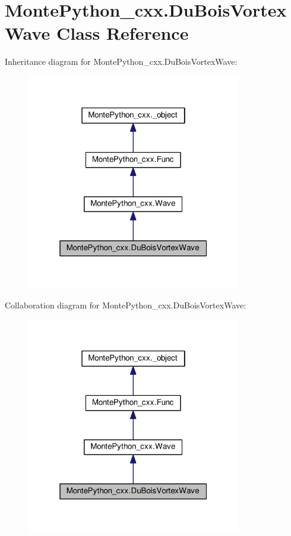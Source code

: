 \hypertarget{classMontePython__cxx_1_1DuBoisVortexWave}{}\section{Monte\+Python\+\_\+cxx.\+Du\+Bois\+Vortex\+Wave Class Reference}
\label{classMontePython__cxx_1_1DuBoisVortexWave}


Inheritance diagram for Monte\+Python\+\_\+cxx.\+Du\+Bois\+Vortex\+Wave\+:
\nopagebreak
\begin{figure}[H]
\begin{center}
\leavevmode
\includegraphics[width=265pt]{classMontePython__cxx_1_1DuBoisVortexWave__inherit__graph}
\end{center}
\end{figure}


Collaboration diagram for Monte\+Python\+\_\+cxx.\+Du\+Bois\+Vortex\+Wave\+:
\nopagebreak
\begin{figure}[H]
\begin{center}
\leavevmode
\includegraphics[width=265pt]{classMontePython__cxx_1_1DuBoisVortexWave__coll__graph}
\end{center}
\end{figure}
